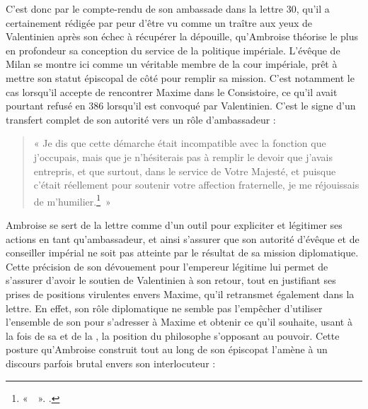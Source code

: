 \bigskip

C'est donc par le compte-rendu de son ambassade dans la lettre 30, qu'il a certainement rédigée par peur d'être vu comme un traître aux yeux de Valentinien après son échec à récupérer la dépouille, qu'Ambroise théorise le plus en profondeur sa conception du service de la politique impériale. L'évêque de Milan se montre ici comme un véritable membre de la cour impériale, prêt à mettre son statut épiscopal de côté pour remplir sa mission. C'est notamment le cas lorsqu'il accepte de rencontrer Maxime dans le Consistoire, ce qu'il avait pourtant refusé en 386 lorsqu'il est convoqué par Valentinien. C'est le signe d'un transfert complet de son autorité vers un rôle d'ambassadeur :

\bigskip

\begin{quote} « Je dis que cette démarche était incompatible avec la fonction que j'occupais, mais que je n'hésiterais pas à remplir le devoir que j'avais entrepris, et que surtout, dans le service de Votre Majesté, et puisque c'était réellement pour soutenir votre affection fraternelle, je me réjouissais de m'humilier.\footnote{«~~». \cite[, 2]{ambroise_csel_82_1}.}~» \end{quote}

\bigskip

Ambroise se sert de la lettre comme d'un outil pour expliciter et légitimer ses actions en tant qu'ambassadeur, et ainsi s'assurer que son autorité d'évêque et de conseiller impérial ne soit pas atteinte par le résultat de sa mission diplomatique. Cette précision de son dévouement pour l'empereur légitime lui permet de s'assurer d'avoir le soutien de Valentinien à son retour, tout en justifiant ses prises de positions virulentes envers Maxime, qu'il retransmet également dans la lettre. En effet, son rôle diplomatique ne semble pas l'empêcher d'utiliser l'ensemble de son  pour s'adresser à Maxime et obtenir ce qu'il souhaite, usant à la fois de sa  et de la , la position du philosophe s'opposant au pouvoir. Cette posture qu'Ambroise construit tout au long de son épiscopat l'amène à un discours parfois brutal envers son interlocuteur :

\bigskip

